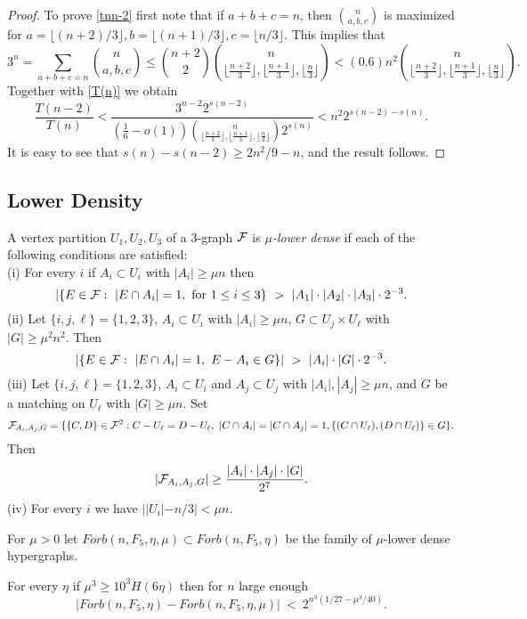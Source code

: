 \documentclass[11pt]{article}
\begin{document}
\begin{proof}
 To prove \eqref{tnn-2}  first note that if $a+b+c=n$, then ${n \choose a,b,c}$ is maximized for $a=\lfloor (n+2)/3\rfloor, b=\lfloor (n+1)/3\rfloor, c=\lfloor n/3\rfloor$. This implies that
 $$3^n=\sum_{a+b+c=n} {n \choose a,b,c} \le {n+2 \choose 2} \binom{n}{\lfloor\frac{n+2}{3}\rfloor,
\lfloor\frac{n+1}{3}\rfloor, \lfloor\frac{n}{3}\rfloor}<(0.6)n^2
\binom{n}{\lfloor\frac{n+2}{3}\rfloor,
\lfloor\frac{n+1}{3}\rfloor, \lfloor\frac{n}{3}\rfloor}
.$$
 Together with \eqref{T(n)} we obtain
 $$
\frac{T(n-2)}{T(n)} < \frac{3^{n-2} 2^{s(n-2)}}{(\frac{1}{6}-o(1)) \binom{n}{\lfloor\frac{n+2}{3}\rfloor,
\lfloor\frac{n+1}{3}\rfloor, \lfloor\frac{n}{3}\rfloor} 2^{s(n)}} < n^2 2^{s(n-2)-s(n)}.$$
It is easy to see that $s(n)-s(n-2)\ge 2n^2/9-n$, and the result follows.
\end{proof}

\subsection{Lower Density}

\begin{definition}\label{defdensity}
A vertex partition $U_1,U_2,U_3$ of a 3-graph $\mathcal{F}$ is {\it $\mu$-lower dense}
if each of the following conditions
 are satisfied:\\
(i) For every $i$ if $A_i\subset U_i$ with $|A_i|\ge \mu n$ then
$$|\{E\in\mathcal{F}: \ |E\cap A_i|=1, \text{ for } 1\le i\le 3\}\ >\ |A_1| \cdot |A_2| \cdot |A_3| \cdot 2^{-3}.$$
(ii) Let $\{i,j,\ell\}=\{1,2,3\}$, $A_i\subset U_i$ with $|A_i|\ge
\mu n$, $G\subset U_j\times U_\ell$ with
 $|G|\ge \mu^2 n^2.$
Then
$$|\{E\in\mathcal{F}: \ |E\cap A_i|=1,\ E-A_i\in G\}|\ >\ |A_i|\cdot |G| \cdot 2^{-3}.$$
(iii) Let $\{i,j,\ell\}=\{1,2,3\}$, $A_i\subset U_i$ and $A_j\subset
U_j$ with $|A_i|,|A_j|\ge \mu n$, and
 $G$ be a matching on
 $U_\ell$ with $|G|\ge \mu n.$
Set
$$\mathcal{F}_{A_i, A_j, G}=\{ \{C, D\} \in \mathcal{F}^2: C-U_\ell=D-U_\ell,\
 |C\cap A_i|=|C\cap A_j|=1,\{(C\cap U_\ell),( D\cap U_\ell)\}\in G\}.$$
Then $$|\mathcal{F}_{A_i, A_j, G}| \ge \frac{|A_i|\cdot |A_j|\cdot  |G|}{
2^{7}}.$$ (iv) For every $i$ we have $||U_i|-n/3|<\mu n$.
\end{definition}

For $\mu>0$ let $Forb(n,F_5,\eta,\mu)\subset Forb(n,F_5,\eta)$ be the
family of $\mu$-lower dense hypergraphs.

\begin{lemma}\label{density}
For every $\eta $ if $\mu^3\ge 10^3H(6\eta)$ then  for $n$ large enough
$$|Forb(n,F_5,\eta)-Forb(n,F_5,\eta,\mu)|\ < \ 2^{n^3(1/27-\mu^3/40)}.$$
\end{lemma}
\end{document}
